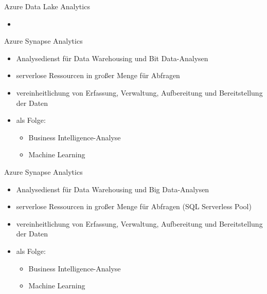 \begin{flashcard}[Definition]{Azure Data Lake Analytics}
  \begin{itemize}
    \item 
  \end{itemize}
\end{flashcard}

\begin{flashcard}[Definition]{Azure Synapse Analytics}
  \begin{itemize}
    \item Analysedienst für Data Warehousing und Bit Data-Analysen
    \item serverlose Ressourcen in großer Menge für Abfragen
    \item vereinheitlichung von Erfassung, Verwaltung, Aufbereitung und Bereitstellung der Daten
    \item als Folge:
      \begin{itemize}
        \item Business Intelligence-Analyse
        \item Machine Learning
      \end{itemize}
  \end{itemize}
\end{flashcard}

\begin{flashcard}[Definition]{Azure Synapse Analytics}
  \begin{itemize}
    \item Analysedienst für Data Warehousing und Big Data-Analysen
    \item serverlose Ressourcen in großer Menge für Abfragen (SQL Serverless Pool)
    \item vereinheitlichung von Erfassung, Verwaltung, Aufbereitung und Bereitstellung der Daten
    \item als Folge:
      \begin{itemize}
        \item Business Intelligence-Analyse
        \item Machine Learning
      \end{itemize}
  \end{itemize}
\end{flashcard}

